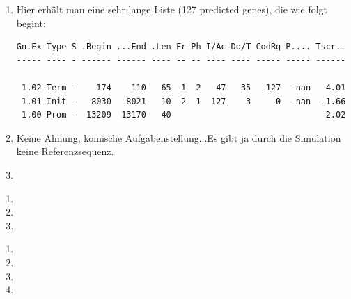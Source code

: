 \documentclass{homework}
\begin{document}
\begin{enumerate}
\begin{enumerate}
\item 
Hier erhält man eine sehr lange Liste (127 predicted genes), die wie folgt begint:
\begin{verbatim}
Gn.Ex Type S .Begin ...End .Len Fr Ph I/Ac Do/T CodRg P.... Tscr..
----- ---- - ------ ------ ---- -- -- ---- ---- ----- ----- ------

 1.02 Term -    174    110   65  1  2   47   35   127  -nan   4.01
 1.01 Init -   8030   8021   10  2  1  127    3     0  -nan  -1.66
 1.00 Prom -  13209  13170   40                               2.02
\end{verbatim}
\item 
Keine Ahnung, komische Aufgabenstellung...Es gibt ja durch die Simulation keine Referenzsequenz. 
\item 
\end{enumerate}


\begin{enumerate}
\item 
\item 
\item
\end{enumerate}


\begin{enumerate}
\item 
\item 
\item
\item
\end{enumerate}

\end{enumerate}
\end{document}
